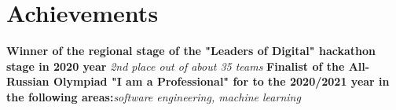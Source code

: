 









\vspace{15pt}
\section{Achievements}
        \textbf{Winner of the regional stage of the "Leaders of Digital" hackathon stage in 2020 year} \newline \emph{2nd place out of about 35 teams}{}
         \newline\textbf{Finalist of the All-Russian Olympiad "I am a Professional" for to the 2020/2021 year in the following areas:}\newline\emph{software engineering, machine learning}{}
         
             \vspace{5pt}
             

